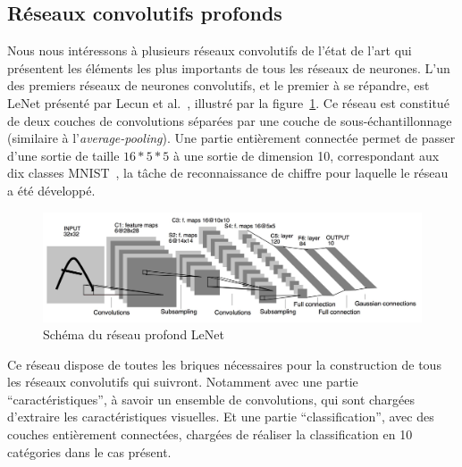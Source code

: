 


\subsection{Réseaux convolutifs profonds}
\label{sec:cnn}

Nous nous intéressons à plusieurs réseaux convolutifs de l'état de l'art qui présentent les éléments les plus importants de tous les réseaux de neurones.
L'un des premiers réseaux de neurones convolutifs, et le premier à se répandre, est LeNet présenté par Lecun et al.~\cite{lecun1998gradient}, illustré par la figure~\ref{fig:lenet}. Ce réseau est constitué de deux couches de convolutions séparées par une couche de sous-échantillonnage (similaire à l'\textit{average-pooling}). 
Une partie entièrement connectée permet de passer d'une sortie de taille $16*5*5$ à une sortie de dimension 10, correspondant aux dix classes MNIST~\cite{lecun1998gradient}, la tâche de reconnaissance de chiffre pour laquelle le réseau a été développé.

\begin{figure}%
\includegraphics[width=\columnwidth]{figures/lenet5.jpg}%
\caption{Schéma du réseau profond LeNet~\cite{lecun1998gradient}}%
\label{fig:lenet}%
\end{figure}

Ce réseau dispose de toutes les briques nécessaires pour la construction de tous les réseaux convolutifs qui suivront.
Notamment avec une partie ``caractéristiques'', à savoir un ensemble de convolutions, qui sont chargées d'extraire les caractéristiques visuelles.
Et une partie ``classification'', avec des couches entièrement connectées, chargées de réaliser la classification en 10 catégories dans le cas présent.

